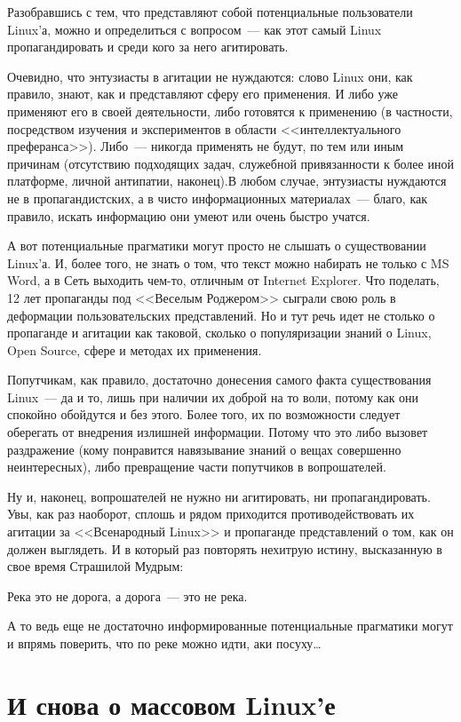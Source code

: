 Разобравшись с тем, что представляют собой потенциальные пользователи Linux'а, можно и определиться с вопросом~--- как этот самый Linux пропагандировать и среди кого за него агитировать.

Очевидно, что энтузиасты в агитации не нуждаются: слово Linux они, как правило, знают, как и представляют сферу его применения. И либо уже применяют его в своей деятельности, либо готовятся к применению (в частности, посредством изучения и экспериментов в области <<интеллектуального преферанса>>). Либо~--- никогда применять не будут, по тем или иным причинам (отсутствию подходящих задач, служебной привязанности к более иной платформе, личной антипатии, наконец).В любом случае, энтузиасты нуждаются не в пропагандистских, а в чисто информационных материалах~--- благо, как правило, искать информацию они умеют или очень быстро учатся.

А вот потенциальные прагматики могут просто не слышать о существовании Linux'а. И, более того, не знать о том, что текст можно набирать не только с MS Word, а в Сеть выходить чем-то, отличным от Internet Explorer. Что поделать, 12 лет пропаганды под <<Веселым Роджером>> сыграли свою роль в деформации пользовательских представлений. Но и тут речь идет не столько о пропаганде и агитации как таковой, сколько о популяризации знаний о Linux, Open Source, сфере и методах их применения.

Попутчикам, как правило, достаточно донесения самого факта существования Linux~--- да и то, лишь при наличии их доброй на то воли, потому как они спокойно обойдутся и без этого. Более того, их по возможности следует оберегать от внедрения излишней информации. Потому что это либо вызовет раздражение (кому понравится навязывание знаний о вещах совершенно неинтересных), либо превращение части попутчиков в вопрошателей.

Ну и, наконец, вопрошателей не нужно ни агитировать, ни пропагандировать. Увы, как раз наоборот, сплошь и рядом приходится противодействовать их агитации за <<Всенародный Linux>> и пропаганде представлений о том, как он должен выглядеть. И в который раз повторять нехитрую истину, высказанную в свое время Страшилой Мудрым:
\begin{shadequote}{}
Река это не дорога, а дорога~--- это не река.
\end{shadequote}
А то ведь еще не достаточно информированные потенциальные прагматики могут и впрямь поверить, что по реке можно идти, аки посуху\dots

\section{И снова о массовом Linux'е} 

